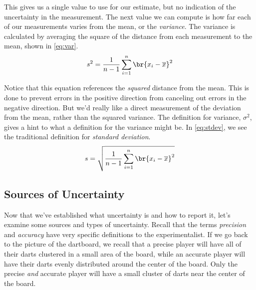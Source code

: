 This gives us a single value to use for our estimate, but no indication of the uncertainty in the measurement. 
The next value we can compute is how far each of our measurements varies from the mean, or the \emph{variance}. 
The variance is calculated by averaging the square of the distance from each measurement to the mean, shown in \cref{eq:var}. 
\begin{equation}
	s^2 = \frac{1}{n-1}\sum_{i=1}^{n}{\br{x_i - \overline{x}}^2}
	\label{eq:var}
\end{equation}

Notice that this equation references the \emph{squared} distance from the mean. 
This is done to prevent errors in the positive direction from canceling out errors in the negative direction.
But we'd really like a direct measurement of the deviation from the mean, rather than the squared variance. 
The definition for variance, \( \sigma^2 \), gives a hint to what a definition for the variance might be. 
In \cref{eq:stdev}, we see the traditional definition for \emph{standard deviation}. 
\begin{equation}
	s = \sqrt{\frac{1}{n-1}\sum_{i=1}^{n}{\br{x_i - \overline{x}}^2}}
	\label{eq:stdev}
\end{equation}


\subsection{Sources of Uncertainty} %
\label{sub:sources_of_uncertainty}

Now that we've established what uncertainty is and how to report it, let's examine some sources and types of uncertainty. 
Recall that the terms \emph{precision} and \emph{accuracy} have very specific definitions to the experimentalist. 
If we go back to the picture of the dartboard, we recall that a precise player will have all of their darts clustered in a small area of the board, while an accurate player will have their darts evenly distributed around the center of the board. 
Only the precise \emph{and} accurate player will have a small cluster of darts near the center of the board. 

